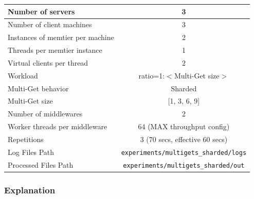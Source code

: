 \documentclass[11pt,a4paper]{article}
\begin{document}
\begin{center}
	\scriptsize{
		\begin{tabular}{|l|c|}
			\hline Number of servers                & 3                       \\ 
			\hline Number of client machines        & 3                       \\ 
			\hline Instances of memtier per machine & 2                       \\ 
			\hline Threads per memtier instance     & 1                       \\
			\hline Virtual clients per thread       & 2     		            \\ 
			\hline Workload                         & ratio=1:$<$Multi-Get size$>$             \\
			\hline Multi-Get behavior               & Sharded                 \\
			\hline Multi-Get size                   & [1, 3, 6, 9]            \\
			\hline Number of middlewares            & 2                       \\
            \hline Worker threads per middleware    & 64 (MAX throughput config) \\
            \hline Repetitions                      & 3 (70 secs, effective 60 secs) \\ 
            \hline Log Files Path                   & \texttt{experiments/multigets\_sharded/logs} \\
            \hline Processed Files Path             & \texttt{experiments/multigets\_sharded/out}\\
            \hline
		\end{tabular}
	} 
\end{center}

\subsubsection{Explanation}
\end{document}
